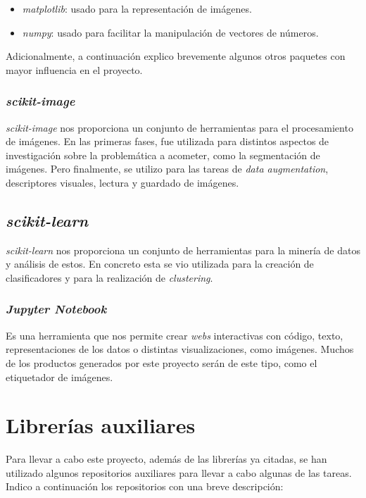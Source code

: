 \begin{itemize}
	\item \textit{matplotlib}: usado para la representación de imágenes.
	\item \textit{numpy}: usado para facilitar la manipulación de vectores de números.
\end{itemize}
 
Adicionalmente, a continuación explico brevemente algunos otros paquetes con mayor influencia en el proyecto.
 
\subsubsection{\textit{scikit-image}}

\textit{scikit-image} nos proporciona un conjunto de herramientas para el procesamiento de imágenes. En las primeras fases, fue utilizada para distintos aspectos de investigación sobre la problemática a acometer, como la segmentación de imágenes. Pero finalmente, se utilizo para las tareas de \textit{data augmentation}, descriptores visuales, lectura y guardado de imágenes.

\subsection{\textit{scikit-learn}}
\textit{scikit-learn} nos proporciona un conjunto de herramientas para la minería de datos y análisis de estos. En concreto esta se vio utilizada para la creación de clasificadores y para la realización de \textit{clustering}.

\subsubsection{\textit{Jupyter Notebook}}

Es una herramienta que nos permite crear \textit{webs} interactivas con código, texto, representaciones de los datos o distintas visualizaciones, como imágenes. Muchos de los productos generados por este proyecto serán de este tipo, como el etiquetador de imágenes.

\section{Librerías auxiliares}

Para llevar a cabo este proyecto, además de las librerías ya citadas, se han utilizado algunos repositorios auxiliares para llevar a cabo algunas de las tareas. Indico a continuación los repositorios con una breve descripción:


